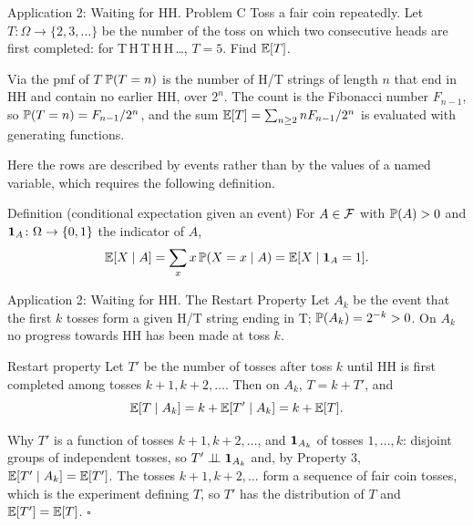 \begin{frame}{Application 2: Waiting for HH. Problem C}
  \small
  Toss a fair coin repeatedly. Let $T\colon\Omega\to\{2,3,\dots\}$ be the number of the toss on which two consecutive heads are first completed: for T\,H\,T\,H\,H\,\dots, $T=5$. Find $\mathbb{E}[T]$.
  \begin{block}{Via the pmf of $T$}
    $\mathbb{P}(T=n)$ is the number of H/T strings of length $n$ that end in HH and contain no earlier HH, over $2^n$. The count is the Fibonacci number $F_{n-1}$, so $\mathbb{P}(T=n)=F_{n-1}/2^n$, and the sum $\mathbb{E}[T]=\sum_{n\ge2}nF_{n-1}/2^n$ is evaluated with generating functions.
  \end{block}
  Here the rows are described by events rather than by the values of a named variable, which requires the following definition.
  \begin{block}{Definition (conditional expectation given an event)}
    For $A\in\mathcal{F}$ with $\mathbb{P}(A)>0$ and $\mathbf{1}_A\colon\Omega\to\{0,1\}$ the indicator of $A$,
    \[
      \mathbb{E}[X\mid A]=\sum_x x\,\mathbb{P}(X=x\mid A)=\mathbb{E}[X\mid \mathbf{1}_A=1].
    \]
  \end{block}
\end{frame}

\begin{frame}{Application 2: Waiting for HH. The Restart Property}
  \small
  Let $A_k$ be the event that the first $k$ tosses form a given H/T string ending in T; $\mathbb{P}(A_k)=2^{-k}>0$. On $A_k$ no progress towards HH has been made at toss $k$.
  \begin{block}{Restart property}
    Let $T'$ be the number of tosses after toss $k$ until HH is first completed among tosses $k+1,k+2,\dots$. Then on $A_k$, $T=k+T'$, and
    \[
      \mathbb{E}[T\mid A_k]=k+\mathbb{E}[T'\mid A_k]=k+\mathbb{E}[T].
    \]
  \end{block}
  \begin{block}{Why}
    $T'$ is a function of tosses $k+1,k+2,\dots$, and $\mathbf{1}_{A_k}$ of tosses $1,\dots,k$: disjoint groups of independent tosses, so $T'\perp\!\!\!\perp\mathbf{1}_{A_k}$ and, by Property 3, $\mathbb{E}[T'\mid A_k]=\mathbb{E}[T']$. The tosses $k+1,k+2,\dots$ form a sequence of fair coin tosses, which is the experiment defining $T$, so $T'$ has the distribution of $T$ and $\mathbb{E}[T']=\mathbb{E}[T]$. \hfill$\square$
  \end{block}
\end{frame}

